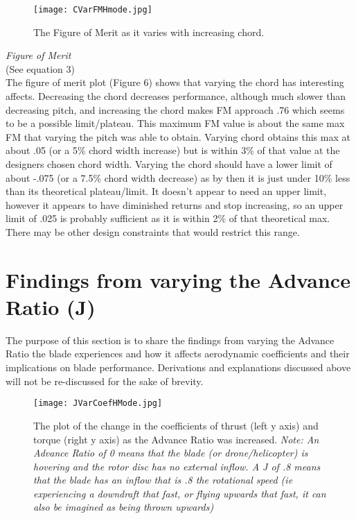 \documentclass[12pt]{texmemo} %
\begin{document}
\vspace{5mm} %

\begin{figure}[h]
\centering
\texttt{[image: CVarFMHmode.jpg]}
\caption{The Figure of Merit as it varies with increasing chord.}
\end{figure}
\vspace{5mm} %

\textit{Figure of Merit} \\
(See equation 3)\\
The figure of merit plot (Figure 6) shows that varying the chord has interesting affects. Decreasing the chord decreases performance, although much slower than decreasing pitch, and increasing the chord makes FM approach .76 which seems to be a possible limit/plateau. This maximum FM value is about the same max FM that varying the pitch was able to obtain. Varying chord obtains this max at about .05 (or a 5\% chord width increase) but is within 3\% of that value at the designers chosen chord width. Varying the chord should have a lower limit of about -.075 (or a 7.5\% chord width decrease) as by then it is just under 10\% less than its theoretical plateau/limit. It doesn't appear to need an upper limit, however it appears to have diminished returns and stop increasing, so an upper limit of .025 is probably sufficient as it is within 2\% of that theoretical max. There may be other design constraints that would restrict this range.

\vspace{5mm} %


\section{Findings from varying the Advance Ratio (J)}
The purpose of this section is to share the findings from varying the Advance Ratio the blade experiences and how it affects aerodynamic coefficients and their implications on blade performance. Derivations and explanations discussed above will not be re-discussed for the sake of brevity.

\vspace{5mm} %

\begin{figure}[h]
\centering
\texttt{[image: JVarCoefHMode.jpg]}
\caption{The plot of the change in the coefficients of thrust (left y axis) and torque (right y axis) as the Advance Ratio was increased. \textit{Note: An Advance Ratio of 0 means that the blade (or drone/helicopter) is hovering and the rotor disc has no external inflow. A J of .8 means that the blade has an inflow that is .8 the rotational speed (ie experiencing a downdraft that fast, or flying upwards that fast, it can also be imagined as being thrown upwards)}}
\end{figure}
\end{document}
